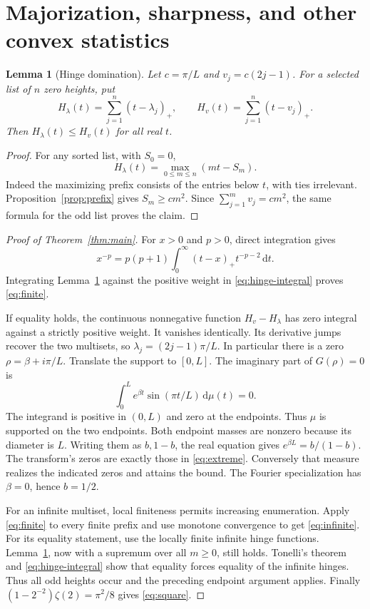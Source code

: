\documentclass[11pt]{article}
\newtheorem{lemma}[theorem]{Lemma}
\theoremstyle{remark}\newtheorem{remark}[theorem]{Remark}
\newcommand{\dd}{\,\mathrm d}
\newcommand{\pos}[1]{(#1)_+}
\begin{document}
\section{Majorization, sharpness, and other convex statistics}

\begin{lemma}[Hinge domination]\label{lem:hinge}
Let $c=\pi/L$ and $v_j=c(2j-1)$. For a selected list of $n$ zero heights, put
\[
 H_\lambda(t)=\sum_{j=1}^n\pos{t-\lambda_j},\qquad
 H_v(t)=\sum_{j=1}^n\pos{t-v_j}.
\]
Then $H_\lambda(t)\le H_v(t)$ for all real $t$.
\end{lemma}

\begin{proof}
For any sorted list, with $S_0=0$,
\[
 H_\lambda(t)=\max_{0\le m\le n}(mt-S_m).
\]
Indeed the maximizing prefix consists of the entries below $t$, with ties
irrelevant. Proposition~\ref{prop:prefix} gives $S_m\ge cm^2$.
Since $\sum_{j=1}^m v_j=cm^2$, the same formula for the odd list proves the claim.
\end{proof}

\begin{proof}[Proof of Theorem~\ref{thm:main}]
For $x>0$ and $p>0$, direct integration gives
\begin{equation}\label{eq:hinge-integral}
 x^{-p}=p(p+1)\int_0^\infty\pos{t-x}t^{-p-2}\dd t.
\end{equation}
Integrating Lemma~\ref{lem:hinge} against the positive weight in
\eqref{eq:hinge-integral} proves \eqref{eq:finite}.

If equality holds, the continuous nonnegative function $H_v-H_\lambda$ has
zero integral against a strictly positive weight. It vanishes identically.
Its derivative jumps recover the two multisets, so
$\lambda_j=(2j-1)\pi/L$. In particular there is a zero
$\rho=\beta+i\pi/L$. Translate the support to $[0,L]$. The imaginary part of
$G(\rho)=0$ is
\[
 \int_0^L e^{\beta t}\sin(\pi t/L)\dd\mu(t)=0.
\]
The integrand is positive in $(0,L)$ and zero at the endpoints. Thus $\mu$ is
supported on the two endpoints. Both endpoint masses are nonzero because its
diameter is $L$. Writing them as $b,1-b$, the real equation gives
$e^{\beta L}=b/(1-b)$. The transform's zeros are exactly those in
\eqref{eq:extreme}. Conversely that measure realizes the indicated zeros and
attains the bound. The Fourier specialization has $\beta=0$, hence $b=1/2$.

For an infinite multiset, local finiteness permits increasing enumeration.
Apply \eqref{eq:finite} to every finite prefix and use monotone convergence to
get \eqref{eq:infinite}. For its equality statement, use the locally finite
infinite hinge functions. Lemma~\ref{lem:hinge}, now with a supremum over all
$m\ge0$, still holds. Tonelli's theorem and \eqref{eq:hinge-integral} show
that equality forces equality of the infinite hinges. Thus all odd heights
occur and the preceding endpoint argument applies. Finally
$(1-2^{-2})\zeta(2)=\pi^2/8$ gives \eqref{eq:square}.
\end{proof}
\end{document}
